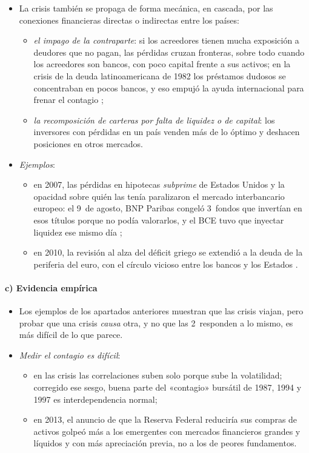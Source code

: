 \documentclass[11pt]{article}
\begin{document}
\begin{itemize}
\item La crisis también se propaga de forma mecánica, en cascada, por las conexiones financieras directas o indirectas entre los países:
  \begin{itemize}
  \item \emph{el impago de la contraparte}: si los acreedores tienen mucha exposición a deudores que no pagan, las pérdidas cruzan fronteras, sobre todo cuando los acreedores son bancos, con poco capital frente a sus activos; en la crisis de la deuda latinoamericana de 1982 los préstamos dudosos se concentraban en pocos bancos, y eso empujó la ayuda internacional para frenar el contagio ;
  \item \emph{la recomposición de carteras por falta de liquidez o de capital}: los inversores con pérdidas en un país venden más de lo óptimo y deshacen posiciones en otros mercados.
  \end{itemize}
\item \emph{Ejemplos}:
  \begin{itemize}
  \item en 2007, las pérdidas en hipotecas \emph{subprime} de Estados Unidos y la opacidad sobre quién las tenía paralizaron el mercado interbancario europeo: el 9~de agosto, BNP Paribas congeló 3~fondos que invertían en esos títulos porque no podía valorarlos, y el BCE tuvo que inyectar liquidez ese mismo día ;
  \item en 2010, la revisión al alza del déficit griego se extendió a la deuda de la periferia del euro, con el círculo vicioso entre los bancos y los Estados  .
  \end{itemize}
\end{itemize}

\paragraph{c) Evidencia empírica}

\begin{itemize}
\item Los ejemplos de los apartados anteriores muestran que las crisis viajan, pero probar que una crisis \emph{causa} otra, y no que las 2~responden a lo mismo, es más difícil de lo que parece.
\item \emph{Medir el contagio es difícil}:
  \begin{itemize}
  \item en las crisis las correlaciones suben solo porque sube la volatilidad; corregido ese sesgo, buena parte del «contagio» bursátil de 1987, 1994 y 1997 es interdependencia normal\nocite{ForbesRigobon2002};
  \item en 2013, el anuncio de que la Reserva Federal reduciría sus compras de activos golpeó más a los emergentes con mercados financieros grandes y líquidos y con más apreciación previa, no a los de peores fundamentos\nocite{EichengreenGupta2015Tapering}.
  \end{itemize}
\end{itemize}
\end{document}
